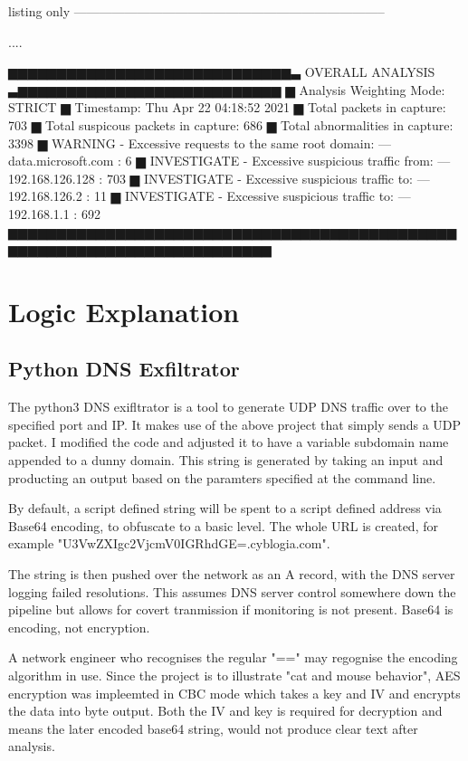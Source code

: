 \begin{tcblisting}{listing only}
--------------------------------------------------------------------------

....

▆▆▆▆▆▆▆▆▆▆▆▆▆▆▆▆▆▆▆▆▆▆▆▆▆▆▆▆▆▃ OVERALL ANALYSIS ▃▆▆▆▆▆▆▆▆▆▆▆▆▆▆▆▆▆▆▆▆▆▆▆▆▆▆▆
▆ Analysis Weighting Mode: STRICT
▆ Timestamp: Thu Apr 22 04:18:52 2021
▆ Total packets in capture:  703
▆ Total suspicous packets in capture:  686
▆ Total abnormalities in capture:  3398
▆ WARNING - Excessive requests to the same root domain: --- data.microsoft.com : 6
▆ INVESTIGATE - Excessive suspicious traffic from: --- 192.168.126.128 : 703
▆ INVESTIGATE - Excessive suspicious traffic to: --- 192.168.126.2 : 11
▆ INVESTIGATE - Excessive suspicious traffic to: --- 192.168.1.1 : 692
▆▆▆▆▆▆▆▆▆▆▆▆▆▆▆▆▆▆▆▆▆▆▆▆▆▆▆▆▆▆▆▆▆▆▆▆▆▆▆▆▆▆▆▆▆▆▆▆▆▆▆▆▆▆▆▆▆▆▆▆▆▆▆▆▆▆▆▆▆▆▆▆▆

\end{tcblisting}





\section{Logic Explanation}
\subsection{Python DNS Exfiltrator}
The python3 DNS exifltrator is a tool to generate UDP DNS traffic over to the specified port and IP. It makes use of the above project that simply sends a UDP packet. I modified the code and adjusted it to have a variable subdomain name appended to a dunny domain.
This string is generated by taking an input and producting an output based on the paramters specified at the command line. 

By default, a script defined string will be spent to a script defined address via Base64 encoding, to obfuscate to a basic level. The whole URL is created,
for example "U3VwZXIgc2VjcmV0IGRhdGE=.cyblogia.com". 

The string is then pushed over the network as an A record, with the DNS server logging failed resolutions. This assumes DNS server control somewhere down the pipeline but allows for covert tranmission if monitoring is not present.
Base64 is encoding, not encryption. 

A network engineer who recognises the regular "==" may regognise the encoding algorithm in use. Since the project is to illustrate "cat and mouse behavior", AES encryption was impleemted in CBC mode which takes a key and IV and encrypts the data into byte output.
Both the IV and key is required for decryption and means the later encoded base64 string, would not produce clear text after analysis. 

